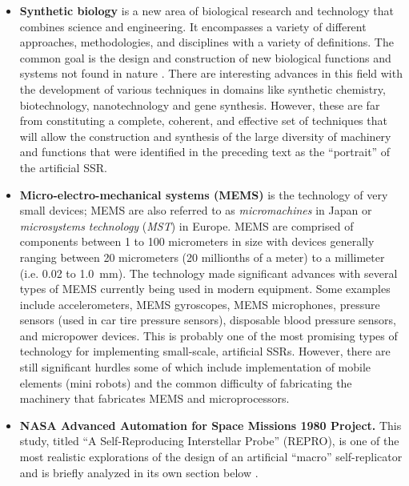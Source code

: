 \begin{itemize}
{biology}. Craig Venter and the scientists at
J. Craig Venter Institute in Rockville, MD
reported in the May 20, 2010 issue of the journal
\textit{Science}
that they created a ``new species---dubbed Mycoplasma mycoides
JCVI-syn1.0---that is similar to one found in nature, except that the
chromosome that controls each cell was created from scratch'' \citep{smith2010, gibsonetal2010}. In the same ABC news report,
Mark Bedau, professor of Philosophy and
Humanities at Reed College in Portland, Oregon, 
called the new species ``a normal
bacterium with a prosthetic genome'' \citep{smith2010}.
\item \textbf{Synthetic biology} is a new area of biological
research and technology that combines science and engineering. It
encompasses a variety of different approaches, methodologies, and
disciplines with a variety of definitions. The common goal is the
design and construction of new biological functions and systems not
found in nature \citep{heinemann2006}. There are interesting advances in this field with the
development of various techniques in domains like synthetic chemistry,
biotechnology, nanotechnology and gene synthesis. However, these are far
from constituting a complete, coherent, and effective set of techniques
that will allow the construction and synthesis of the large diversity
of machinery and functions that were identified in the preceding text as
the ``portrait'' of the artificial SSR.
\item \textbf{Micro-electro-mechanical systems (MEMS)} is the technology
of very small devices; MEMS are also referred to as
\textit{micromachines} in Japan or \textit{microsystems technology} (\textit{MST}) in Europe. 
MEMS are comprised of components between 1 to
100 micrometers in size with devices generally ranging between 20 micrometers (20 millionths of a meter)
to a millimeter (i.e. 0.02 to 1.0~mm)\citep{lyshevski2000}. The technology made significant
advances with several types of MEMS currently being used in modern
equipment.  Some examples include accelerometers, MEMS gyroscopes, MEMS microphones, pressure
sensors (used in car tire pressure sensors), disposable blood pressure
sensors, and micropower devices. This is probably one of the most
promising types of technology for implementing small-scale, artificial
SSRs. However, there are still significant hurdles some of which include implementation of
mobile elements (mini robots) and the common difficulty of fabricating
the machinery that fabricates MEMS and microprocessors.
\item \textbf{NASA Advanced Automation for Space Missions 1980 Project.}
This study, titled ``A Self-Reproducing Interstellar Probe'' (REPRO), 
is one of the most realistic explorations of the design of
an artificial ``macro'' self-replicator and is briefly analyzed in its
own section below \citep{freitas1980}.
\end{itemize}

